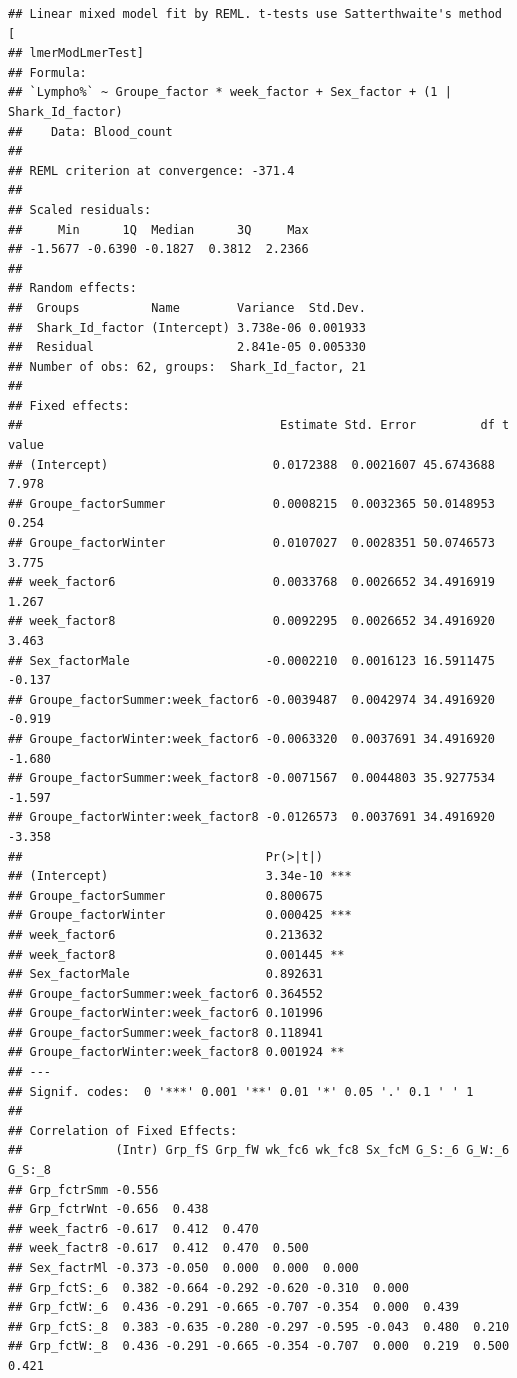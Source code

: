 \documentclass[
]{article}
\begin{document}
\begin{verbatim}
## Linear mixed model fit by REML. t-tests use Satterthwaite's method [
## lmerModLmerTest]
## Formula: 
## `Lympho%` ~ Groupe_factor * week_factor + Sex_factor + (1 | Shark_Id_factor)
##    Data: Blood_count
## 
## REML criterion at convergence: -371.4
## 
## Scaled residuals: 
##     Min      1Q  Median      3Q     Max 
## -1.5677 -0.6390 -0.1827  0.3812  2.2366 
## 
## Random effects:
##  Groups          Name        Variance  Std.Dev.
##  Shark_Id_factor (Intercept) 3.738e-06 0.001933
##  Residual                    2.841e-05 0.005330
## Number of obs: 62, groups:  Shark_Id_factor, 21
## 
## Fixed effects:
##                                    Estimate Std. Error         df t value
## (Intercept)                       0.0172388  0.0021607 45.6743688   7.978
## Groupe_factorSummer               0.0008215  0.0032365 50.0148953   0.254
## Groupe_factorWinter               0.0107027  0.0028351 50.0746573   3.775
## week_factor6                      0.0033768  0.0026652 34.4916919   1.267
## week_factor8                      0.0092295  0.0026652 34.4916920   3.463
## Sex_factorMale                   -0.0002210  0.0016123 16.5911475  -0.137
## Groupe_factorSummer:week_factor6 -0.0039487  0.0042974 34.4916920  -0.919
## Groupe_factorWinter:week_factor6 -0.0063320  0.0037691 34.4916920  -1.680
## Groupe_factorSummer:week_factor8 -0.0071567  0.0044803 35.9277534  -1.597
## Groupe_factorWinter:week_factor8 -0.0126573  0.0037691 34.4916920  -3.358
##                                  Pr(>|t|)    
## (Intercept)                      3.34e-10 ***
## Groupe_factorSummer              0.800675    
## Groupe_factorWinter              0.000425 ***
## week_factor6                     0.213632    
## week_factor8                     0.001445 ** 
## Sex_factorMale                   0.892631    
## Groupe_factorSummer:week_factor6 0.364552    
## Groupe_factorWinter:week_factor6 0.101996    
## Groupe_factorSummer:week_factor8 0.118941    
## Groupe_factorWinter:week_factor8 0.001924 ** 
## ---
## Signif. codes:  0 '***' 0.001 '**' 0.01 '*' 0.05 '.' 0.1 ' ' 1
## 
## Correlation of Fixed Effects:
##             (Intr) Grp_fS Grp_fW wk_fc6 wk_fc8 Sx_fcM G_S:_6 G_W:_6 G_S:_8
## Grp_fctrSmm -0.556                                                        
## Grp_fctrWnt -0.656  0.438                                                 
## week_factr6 -0.617  0.412  0.470                                          
## week_factr8 -0.617  0.412  0.470  0.500                                   
## Sex_factrMl -0.373 -0.050  0.000  0.000  0.000                            
## Grp_fctS:_6  0.382 -0.664 -0.292 -0.620 -0.310  0.000                     
## Grp_fctW:_6  0.436 -0.291 -0.665 -0.707 -0.354  0.000  0.439              
## Grp_fctS:_8  0.383 -0.635 -0.280 -0.297 -0.595 -0.043  0.480  0.210       
## Grp_fctW:_8  0.436 -0.291 -0.665 -0.354 -0.707  0.000  0.219  0.500  0.421
\end{verbatim}
\end{document}
